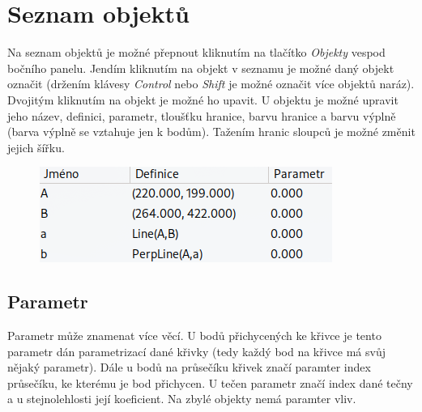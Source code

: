 \documentclass[11pt]{article}
\begin{document}
    \section{Seznam objektů}
    Na seznam objektů je možné přepnout kliknutím na tlačítko \textit{Objekty} vespod bočního panelu. Jendím kliknutím na objekt v seznamu je možné daný objekt označit (držením klávesy \textit{Control} nebo \textit{Shift} je možné označit více objektů naráz). Dvojitým kliknutím na objekt je možné ho upavit. U objektu je možné upravit jeho název, definici, parametr, tloušťku hranice, barvu hranice a barvu výplně (barva výplně se vztahuje jen k bodům). Tažením hranic sloupců je možné změnit jejich šířku.
    \begin{figure}[h]
        \begin{center}
        \includegraphics[scale=0.5]{imgs/obj_list.png}
        \end{center}
    \end{figure}
    \vspace{-20pt}
    \subsection{Parametr}
    Parametr může znamenat více věcí. U bodů přichycených ke křivce je tento parametr dán parametrizací dané křivky (tedy každý bod na křivce má svůj nějaký parametr). Dále u bodů na průsečíku křivek značí paramter index průsečíku, ke kterému je bod přichycen. U tečen parametr značí index dané tečny a u stejnolehlosti její koeficient. Na zbylé objekty nemá paramter vliv.
\end{document}
